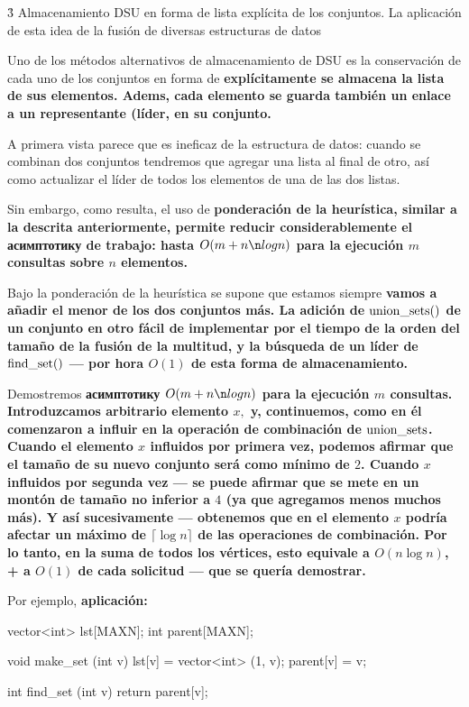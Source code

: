 \h3{ Almacenamiento DSU en forma de lista explícita de los conjuntos. La aplicación de esta idea de la fusión de diversas estructuras de datos }

Uno de los métodos alternativos de almacenamiento de DSU es la conservación de cada uno de los conjuntos en forma de \bf{explícitamente se almacena la lista de sus elementos}. Adems, cada elemento se guarda también un enlace a un representante (líder, en su conjunto.

A primera vista parece que es ineficaz de la estructura de datos: cuando se combinan dos conjuntos tendremos que agregar una lista al final de otro, así como actualizar el líder de todos los elementos de una de las dos listas.

Sin embargo, como resulta, el uso de \bf{ponderación de la heurística}, similar a la descrita anteriormente, permite reducir considerablemente el асимптотику de trabajo: hasta $O(m + n \n log n)$ para la ejecución $m$ consultas sobre $n$ elementos.

Bajo la ponderación de la heurística se supone que estamos siempre \bf{vamos a añadir el menor de los dos conjuntos más}. La adición de ${\rm union\_sets}()$ de un conjunto en otro fácil de implementar por el tiempo de la orden del tamaño de la fusión de la multitud, y la búsqueda de un líder de ${\rm find\_set}()$ --- por hora $O(1)$ de esta forma de almacenamiento.

Demostremos \bf{асимптотику} $O(m + n \n log n)$ para la ejecución $m$ consultas. Introduzcamos arbitrario elemento $x,$ y, continuemos, como en él comenzaron a influir en la operación de combinación de ${\rm union\_sets}$. Cuando el elemento $x$ influidos por primera vez, podemos afirmar que el tamaño de su nuevo conjunto será como mínimo de $2$. Cuando $x$ influidos por segunda vez --- se puede afirmar que se mete en un montón de tamaño no inferior a $4$ (ya que agregamos menos muchos más). Y así sucesivamente --- obtenemos que en el elemento $x$ podría afectar un máximo de $\lceil \log n \rceil$ de las operaciones de combinación. Por lo tanto, en la suma de todos los vértices, esto equivale a $O (n \log n)$, + a $O(1)$ de cada solicitud --- que se quería demostrar.

Por ejemplo, \bf{aplicación}:

\code
vector<int> lst[MAXN];
int parent[MAXN];

void make_set (int v) {
lst[v] = vector<int> (1, v);
parent[v] = v;
}

int find_set (int v) {
return parent[v];
}

